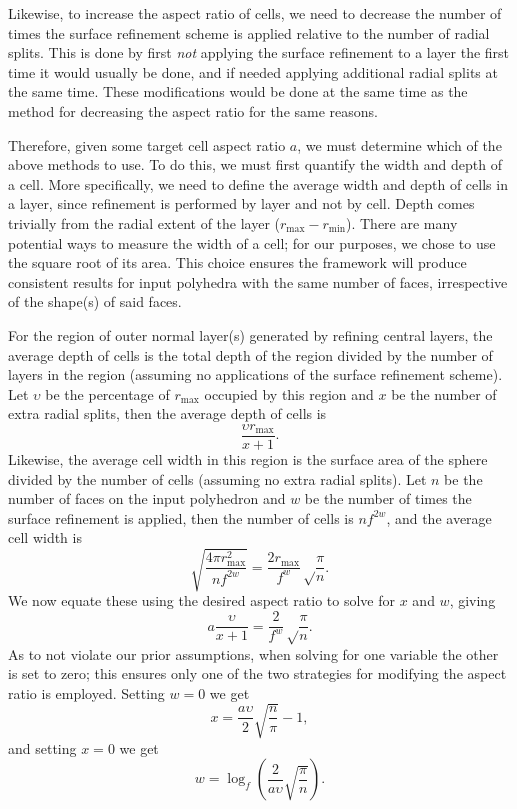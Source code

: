 Likewise, to increase the aspect ratio of cells, we need to decrease the number of times the surface refinement scheme is applied relative to the number of radial splits.
This is done by first \textit{not} applying the surface refinement to a layer the first time it would usually be done, and if needed applying additional radial splits at the same time.
These modifications would be done at the same time as the method for decreasing the aspect ratio for the same reasons.


Therefore, given some target cell aspect ratio $a$, we must determine which of the above methods to use.
To do this, we must first quantify the width and depth of a cell.
More specifically, we need to define the average width and depth of cells in a layer, since refinement is performed by layer and not by cell.
Depth comes trivially from the radial extent of the layer ($r_\mathrm{max} - r_\mathrm{min}$).
There are many potential ways to measure the width of a cell; for our purposes, we chose to use the square root of its area.
This choice ensures the framework will produce consistent results for input polyhedra with the same number of faces, irrespective of the shape(s) of said faces.


For the region of outer normal layer(s) generated by refining central layers, the average depth of cells is the total depth of the region divided by the number of layers in the region (assuming no applications of the surface refinement scheme).
Let $\upsilon$ be the percentage of $r_\mathrm{max}$ occupied by this region and $x$ be the number of extra radial splits, then the average depth of cells is
%
\begin{equation*}
\frac{\upsilon r_\mathrm{max}}{x+1}.
\end{equation*}
%
Likewise, the average cell width in this region is the surface area of the sphere divided by the number of cells (assuming no extra radial splits).
Let $n$ be the number of faces on the input polyhedron and $w$ be the number of times the surface refinement is applied, then the number of cells is $n f^{2w}$, and the average cell width is
%
\begin{equation*}
\sqrt{ \frac{ 4 \pi r_\mathrm{max}^2 }{ n f^{2 w} } } = \frac{2 r_\mathrm{max}}{f^w} \sqrt\frac{\pi}{n}.
\end{equation*}
%
We now equate these using the desired aspect ratio to solve for $x$ and $w$, giving
%
\begin{equation*}
a \frac{\upsilon}{x+1} = \frac{2}{f^w} \sqrt\frac{\pi}{n}.
\end{equation*}
%
As to not violate our prior assumptions, when solving for one variable the other is set to zero; this ensures only one of the two strategies for modifying the aspect ratio is employed.
Setting $w = 0$ we get
%
\begin{equation}
x = \frac{a \upsilon}{2} \sqrt{\frac{n}{\pi}} - 1,
\label{eq:extraSplits}
\end{equation}
%
and setting $x = 0$ we get
%
\begin{equation}
w = \log_{f} \left( \frac{2}{a \upsilon} \sqrt{ \frac{\pi}{n}} \right).
\label{eq:num2D}
\end{equation}


